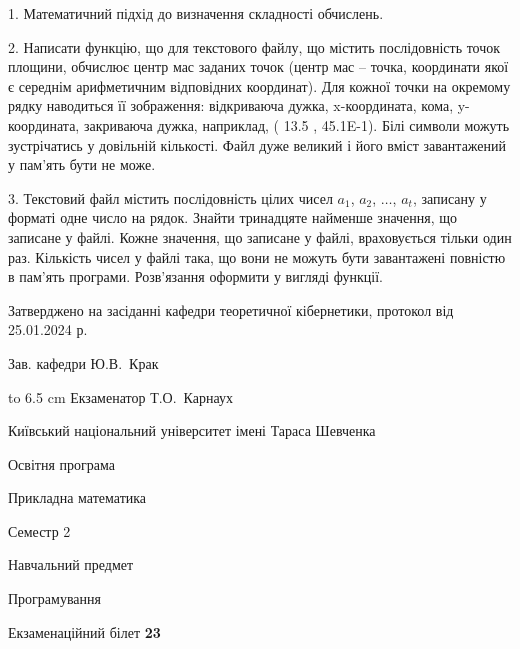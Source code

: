 \documentclass[12pt, ukrainian]{article}
\begin{document}
{%
1. Математичний підхід до визначення складності обчислень.%
\par
2. Написати функцію, що для текстового файлу, що містить послідовність точок площини, обчислює центр мас заданих точок (центр мас -- точка, координати якої є середнім арифметичним відповідних координат). Для кожної точки на окремому рядку наводиться її зображення: відкриваюча дужка, x-координата, кома, y-координата, закриваюча дужка, наприклад, ( 13.5 , 45.1E-1). Білі символи можуть зустрічатись у довільній кількості. Файл дуже великий і його вміст завантажений у пам'ять бути не може.

\par
3. Текстовий файл містить послідовність цілих чисел $a_1$, $a_2$, $\ldots$, $a_t$, записану у форматі одне число на рядок. Знайти тринадцяте найменше значення, що записане у файлі. Кожне значення, що записане у файлі, враховується тільки один раз. Кількість чисел у файлі така, що вони не можуть бути завантажені повністю в пам'ять програми. Розв'язання оформити у вигляді функції.

}
{\smallskip\smallskip \begin {scriptsize} Затверджено на засіданні кафедри теоретичної кібернетики, протокол   від   25.01.2024 р.\par\smallskip\smallskip\smallskip\smallskip
{\parbox {6.5 cm} {Зав. кафедри \dotfill Ю.В.~Крак}}\hspace {0.7cm} {\hbox to 6.5 cm { Екзаменатор \dotfill Т.О.~Карнаух}} \end{scriptsize}}
\vspace{0.9cm}
{{\begin {scriptsize}\par
{ \center  Київський національний університет імені Тараса Шевченка \par}
{\parbox {5 cm}{Освітня програма \hfill}{\parbox {7 cm}{Прикладна математика\hfill}}\parbox {6 cm}{\hfill Семестр 2}}\par
{\parbox {5 cm} {Навчальний предмет \hfill}\parbox {7 cm}{Програмування \hfill}\parbox {6cm}{\hfill}\par}\vspace{-15pt} \end{scriptsize}}{\center Екзаменаційний білет \No \textbf { 23 }\par}}
\end{document}
